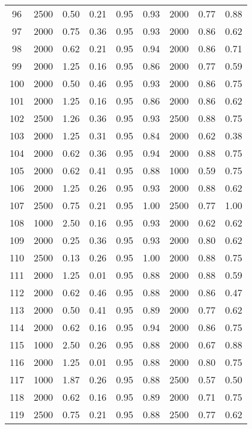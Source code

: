 \begin{longtable}[c]{ccccccccc}
96  &  2500 &  0.50 &  0.21 &  0.95 &  0.93 &  2000 &  0.77 &  0.88 \\
97  &  2000 &  0.75 &  0.36 &  0.95 &  0.93 &  2000 &  0.86 &  0.62 \\
98  &  2000 &  0.62 &  0.21 &  0.95 &  0.94 &  2000 &  0.86 &  0.71 \\
99  &  2000 &  1.25 &  0.16 &  0.95 &  0.86 &  2000 &  0.77 &  0.59 \\
100 &  2000 &  0.50 &  0.46 &  0.95 &  0.93 &  2000 &  0.86 &  0.75 \\
101 &  2000 &  1.25 &  0.16 &  0.95 &  0.86 &  2000 &  0.86 &  0.62 \\
102 &  2500 &  1.26 &  0.36 &  0.95 &  0.93 &  2500 &  0.88 &  0.75 \\
103 &  2000 &  1.25 &  0.31 &  0.95 &  0.84 &  2000 &  0.62 &  0.38 \\
104 &  2000 &  0.62 &  0.36 &  0.95 &  0.94 &  2000 &  0.88 &  0.75 \\
105 &  2000 &  0.62 &  0.41 &  0.95 &  0.88 &  1000 &  0.59 &  0.75 \\
106 &  2000 &  1.25 &  0.26 &  0.95 &  0.93 &  2000 &  0.88 &  0.62 \\
107 &  2500 &  0.75 &  0.21 &  0.95 &  1.00 &  2500 &  0.77 &  1.00 \\
108 &  1000 &  2.50 &  0.16 &  0.95 &  0.93 &  2000 &  0.62 &  0.62 \\
109 &  2000 &  0.25 &  0.36 &  0.95 &  0.93 &  2000 &  0.80 &  0.62 \\
110 &  2500 &  0.13 &  0.26 &  0.95 &  1.00 &  2000 &  0.88 &  0.75 \\
111 &  2000 &  1.25 &  0.01 &  0.95 &  0.88 &  2000 &  0.88 &  0.59 \\
112 &  2000 &  0.62 &  0.46 &  0.95 &  0.88 &  2000 &  0.86 &  0.47 \\
113 &  2000 &  0.50 &  0.41 &  0.95 &  0.89 &  2000 &  0.77 &  0.62 \\
114 &  2000 &  0.62 &  0.16 &  0.95 &  0.94 &  2000 &  0.86 &  0.75 \\
115 &  1000 &  2.50 &  0.26 &  0.95 &  0.88 &  2000 &  0.67 &  0.88 \\
116 &  2000 &  1.25 &  0.01 &  0.95 &  0.88 &  2000 &  0.80 &  0.75 \\
117 &  1000 &  1.87 &  0.26 &  0.95 &  0.88 &  2500 &  0.57 &  0.50 \\
118 &  2000 &  0.62 &  0.16 &  0.95 &  0.89 &  2000 &  0.71 &  0.75 \\
119 &  2500 &  0.75 &  0.21 &  0.95 &  0.88 &  2500 &  0.77 &  0.62 \\

\end{longtable}
